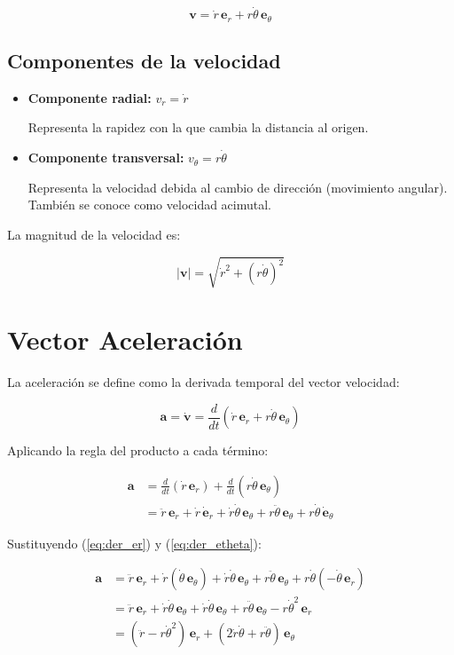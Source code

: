 \documentclass[12pt,a4paper]{article}
\begin{document}
\begin{equation}
    \boxed{\mathbf{v} = \dot{r}\,\mathbf{e}_r + r\dot{\theta}\,\mathbf{e}_\theta}
    \label{eq:velocidad}
\end{equation}

\subsection{Componentes de la velocidad}

\begin{itemize}
    \item \textbf{Componente radial:} $v_r = \dot{r}$
    
    Representa la rapidez con la que cambia la distancia al origen.
    
    \item \textbf{Componente transversal:} $v_\theta = r\dot{\theta}$
    
    Representa la velocidad debida al cambio de dirección (movimiento angular).
    También se conoce como velocidad acimutal.
\end{itemize}

La magnitud de la velocidad es:

\[
|\mathbf{v}| = \sqrt{\dot{r}^2 + (r\dot{\theta})^2}
\]

\section{Vector Aceleración}

La aceleración se define como la derivada temporal del vector velocidad:

\[
\mathbf{a} = \dot{\mathbf{v}} = \frac{d}{dt}(\dot{r}\,\mathbf{e}_r + r\dot{\theta}\,\mathbf{e}_\theta)
\]

Aplicando la regla del producto a cada término:

\begin{align*}
    \mathbf{a} &= \frac{d}{dt}(\dot{r}\,\mathbf{e}_r) + \frac{d}{dt}(r\dot{\theta}\,\mathbf{e}_\theta) \\[4pt]
    &= \ddot{r}\,\mathbf{e}_r + \dot{r}\,\dot{\mathbf{e}}_r
       + \dot{r}\dot{\theta}\,\mathbf{e}_\theta + r\ddot{\theta}\,\mathbf{e}_\theta
       + r\dot{\theta}\,\dot{\mathbf{e}}_\theta
\end{align*}

Sustituyendo (\ref{eq:der_er}) y (\ref{eq:der_etheta}):

\begin{align*}
    \mathbf{a} &= \ddot{r}\,\mathbf{e}_r + \dot{r}(\dot{\theta}\,\mathbf{e}_\theta)
               + \dot{r}\dot{\theta}\,\mathbf{e}_\theta + r\ddot{\theta}\,\mathbf{e}_\theta
               + r\dot{\theta}(-\dot{\theta}\,\mathbf{e}_r) \\[4pt]
    &= \ddot{r}\,\mathbf{e}_r + \dot{r}\dot{\theta}\,\mathbf{e}_\theta
       + \dot{r}\dot{\theta}\,\mathbf{e}_\theta + r\ddot{\theta}\,\mathbf{e}_\theta
       - r\dot{\theta}^2\,\mathbf{e}_r \\[4pt]
    &= (\ddot{r} - r\dot{\theta}^2)\,\mathbf{e}_r
       + (2\dot{r}\dot{\theta} + r\ddot{\theta})\,\mathbf{e}_\theta
\end{align*}
\end{document}
